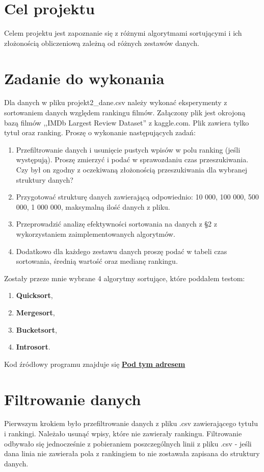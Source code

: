 \documentclass[12pt]{article}
\begin{document}

    
\tableofcontents
\newpage
\section{Cel projektu}
Celem projektu jest zapoznanie się z różnymi algorytmami sortującymi i ich złożonością obliczeniową zależną od różnych zestawów danych. 
\section{Zadanie do wykonania}
Dla danych w pliku projekt2\_dane.csv należy wykonać eksperymenty z sortowaniem danych względem
rankingu filmów. Załączony plik jest okrojoną bazą filmów ,,IMDb Largest Review Dataset'' z kaggle.com.
Plik zawiera tylko tytuł oraz ranking. Proszę o wykonanie następujących zadań:
\begin{enumerate}
    \item Przefiltrowanie danych i usunięcie pustych wpisów w polu ranking (jeśli występują). Proszę zmierzyć
    i podać w sprawozdaniu czas przeszukiwania. Czy był on zgodny z oczekiwaną złożonością przeszukiwania
    dla wybranej struktury danych?
    \item Przygotować strukturę danych zawierającą odpowiednio: 10 000, 100 000, 500 000, 1 000 000,
    maksymalną ilość danych z pliku.
    \item Przeprowadzić analizę efektywności sortowania na danych z §2 z wykorzystaniem zaimplementowanych
    algorytmów. 
    \item  Dodatkowo dla każdego zestawu danych proszę podać w tabeli czas sortowania, średnią wartość
    oraz medianę rankingu.
    
\end{enumerate}
Zostały przeze mnie wybrane 4 algorytmy sortujące, które poddałem testom:

\begin{enumerate}
    \item \textbf{Quicksort},
    \item \textbf{Mergesort},
    \item \textbf{Bucketsort},
    \item \textbf{Introsort}.
\end{enumerate}

Kod źródłowy programu znajduje się \href{https://github.com/PartyKusZ/PAMSI/tree/main/projekt_2-maj/src}{\textbf{Pod tym adresem}}
\section{Filtrowanie danych}\label{ch: filtorwanie}
Pierwszym krokiem było przefiltrowanie danych z pliku .csv zawierającego tytułu i rankingi. Należało usunąć wpisy, 
które nie zawierały rankingu. Filtrowanie odbywało się jednocześnie z pobieraniem poszczególnych linii z pliku .csv - jeśli dana 
linia nie zawierała pola z rankingiem to nie zostawała zapisana do struktury danych. 
\end{document}
